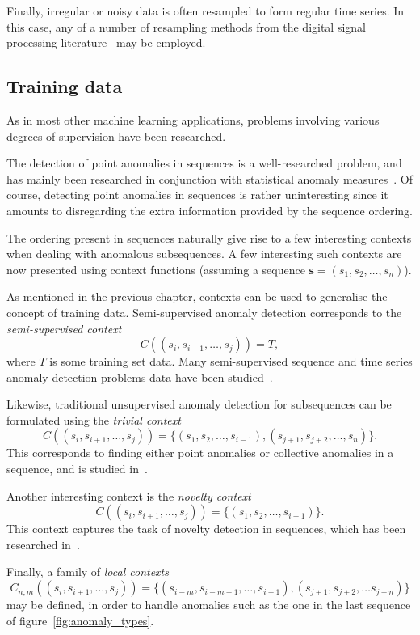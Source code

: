 Finally, irregular or noisy data is often resampled to form regular time series. In this case, any of a number of resampling methods from the digital signal processing literature~\cite{TODO} may be employed.

\subsection{Training data}

As in most other machine learning applications, problems involving various degrees of supervision have been researched.

The detection of point anomalies in sequences is a well-researched problem, and has mainly been researched in conjunction with statistical anomaly measures~\cite{TODO}. Of course, detecting point anomalies in sequences is rather uninteresting since it amounts to disregarding the extra information provided by the sequence ordering.

The ordering present in sequences naturally give rise to a few interesting contexts when dealing with anomalous subsequences. A few interesting such contexts are now presented using context functions (assuming a sequence $\mathbf{s} = (s_1, s_2, \dots, s_n)$).

As mentioned in the previous chapter, contexts can be used to generalise the concept of training data. Semi-supervised anomaly detection corresponds to the \emph{semi-supervised context}
\[
    C((s_i, s_{i+1}, \dots, s_j)) = T,
\]
where $T$ is some training set data. Many semi-supervised sequence and time series anomaly detection problems data have been studied~\cite{TODO}.

Likewise, traditional unsupervised anomaly detection for subsequences can be formulated using the \emph{trivial context}
\[
    C((s_i, s_{i+1}, \dots, s_j)) = \{ (s_1, s_2, \dots, s_{i-1}), (s_{j+1}, s_{j+2}, \dots, s_n) \}.
\]
This corresponds to finding either point anomalies or collective anomalies in a sequence, and is studied in~\cite{TODO}.

Another interesting context is the \emph{novelty context}
\[
    C((s_i, s_{i+1}, \dots, s_j)) = \{(s_1, s_2, \dots, s_{i-1})\}.
\]
This context captures the task of novelty detection in sequences, which has been researched in~\cite{TODO}.

Finally, a family of \emph{local contexts}
\[
    C_{n,m}((s_i, s_{i+1}, \dots, s_j)) = \{(s_{i-m}, s_{i-m+1}, \dots, s_{i-1}), (s_{j+1}, s_{j+2}, \ldots s_{j+n})\}
\]
may be defined, in order to handle anomalies such as the one in the last sequence of figure~\ref{fig:anomaly_types}.


